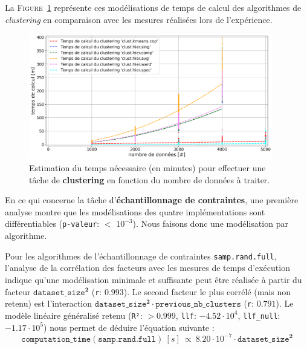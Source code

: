 			La \textsc{Figure~\ref{figure:4.3.2-ETUDE-COUTS-TEMPS-CALCUL-MODELISATION-CLUSTERING}} représente ces modélisations de temps de calcul des algorithmes de \textit{clustering} en comparaison avec les mesures réalisées lors de l'expérience.
			\newline
			\begin{figure}[!htb]
				\centering
				\includegraphics[width=0.95\textwidth]{figures/etude-temps-calcul-modelisation-3clust}
				\caption{
					Estimation du temps nécessaire (en minutes) pour effectuer une tâche de \textbf{clustering} en fonction du nombre de données à traiter.
				}
				\label{figure:4.3.2-ETUDE-COUTS-TEMPS-CALCUL-MODELISATION-CLUSTERING}
			\end{figure}
			
			
			En ce qui concerne la tâche d'\textbf{échantillonnage de contraintes}, une première analyse montre que les modélisations des quatre implémentations sont différentiables  (\texttt{p-valeur}: $<$ \texttt{$10^{-3}$}). Nous faisons donc une modélisation par algorithme.
			
			Pour les algorithmes de l'échantillonnage de contraintes \texttt{samp.rand.full}, l'analyse de la corrélation des facteurs avec les mesures de temps d'exécution indique qu'une modélisation minimale et suffisante peut être réalisée à partir du facteur $\texttt{dataset\_size}^{\textbf{2}}$ (\texttt{r}: $0.993$).
			Le second facteur le plus corrélé (mais non retenu) est l'interaction $\texttt{dataset\_size}^{\textbf{2}} \cdot \texttt{previous\_nb\_clusters}$ (\texttt{r}: $0.791$).
			Le modèle linéaire généralisé retenu (\texttt{R²}: $> 0.999$, \texttt{llf}: $-4.52 \cdot 10^{4}$, \texttt{llf\_null}: $-1.17 \cdot 10^{5}$) nous permet de déduire l'équation suivante :
			\begin{equation}
				\texttt{computation\_time}(\texttt{samp.rand.full})~[s]~
				\propto~8.20 \cdot 10^{-7} \cdot \texttt{dataset\_size}^{\textbf{2}}
			\end{equation}
			

